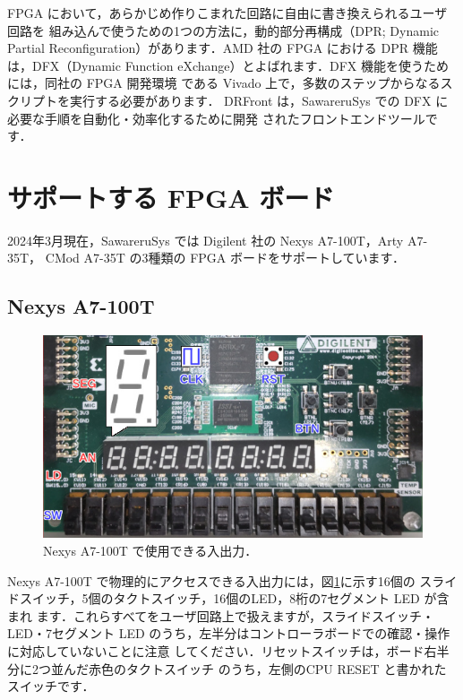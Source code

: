 FPGA において，あらかじめ作りこまれた回路に自由に書き換えられるユーザ回路を
組み込んで使うための1つの方法に，動的部分再構成（DPR; Dynamic Partial
Reconfiguration）があります．AMD 社の FPGA における DPR 機能は，DFX（Dynamic
Function eXchange）とよばれます．DFX 機能を使うためには，同社の FPGA 開発環境
である Vivado 上で，多数のステップからなるスクリプトを実行する必要があります．
DRFront は，SawareruSys での DFX に必要な手順を自動化・効率化するために開発
されたフロントエンドツールです．

\section{サポートする FPGA ボード}

2024年3月現在，SawareruSys では Digilent 社の Nexys A7-100T，Arty A7-35T，
CMod A7-35T の3種類の FPGA ボードをサポートしています．

\subsection{Nexys A7-100T}

\begin{figure}[ht]
 \centering
 \includegraphics[width=90truemm]{figs/Nexys.jpg}
 \caption{Nexys A7-100T で使用できる入出力．}
 \label{fig:Nexys}
\end{figure}

Nexys A7-100T で物理的にアクセスできる入出力には，図\ref{fig:Nexys}に示す16個の
スライドスイッチ，5個のタクトスイッチ，16個のLED，8桁の7セグメント LED が含まれ
ます．これらすべてをユーザ回路上で扱えますが，スライドスイッチ・LED・7セグメント
LED のうち，左半分はコントローラボードでの確認・操作に対応していないことに注意
してください．リセットスイッチは，ボード右半分に2つ並んだ赤色のタクトスイッチ
のうち，左側のCPU RESET と書かれたスイッチです．

